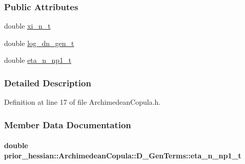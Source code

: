\subsubsection*{Public Attributes}
\begin{DoxyCompactItemize}
\item 
double \hyperlink{structprior__hessian_1_1ArchimedeanCopula_1_1D2__GenTerms_aadd126868dd8a82b8189ba2fe50d7503}{xi\+\_\+n\+\_\+t}
\item 
double \hyperlink{structprior__hessian_1_1ArchimedeanCopula_1_1D__GenTerms_a32ee7fddd5bbd1af598c8d21015c7125}{log\+\_\+dn\+\_\+gen\+\_\+t}
\item 
double \hyperlink{structprior__hessian_1_1ArchimedeanCopula_1_1D__GenTerms_a5dff2f37bb7e708a87415b0f7546eb6b}{eta\+\_\+n\+\_\+np1\+\_\+t}
\end{DoxyCompactItemize}


\subsubsection{Detailed Description}


Definition at line 17 of file Archimedean\+Copula.\+h.



\subsubsection{Member Data Documentation}
\paragraph[{\texorpdfstring{eta\+\_\+n\+\_\+np1\+\_\+t}{eta_n_np1_t}}]{\setlength{\rightskip}{0pt plus 5cm}double prior\+\_\+hessian\+::\+Archimedean\+Copula\+::\+D\+\_\+\+Gen\+Terms\+::eta\+\_\+n\+\_\+np1\+\_\+t\hspace{0.3cm}{\ttfamily [inherited]}}\hypertarget{structprior__hessian_1_1ArchimedeanCopula_1_1D__GenTerms_a5dff2f37bb7e708a87415b0f7546eb6b}{}\label{structprior__hessian_1_1ArchimedeanCopula_1_1D__GenTerms_a5dff2f37bb7e708a87415b0f7546eb6b}


